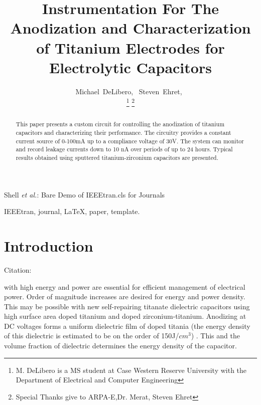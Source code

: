 \documentclass[journal]{IEEEtran}
\begin{document}
\title{Instrumentation For The Anodization and Characterization of Titanium Electrodes for Electrolytic Capacitors}

\author{Michael~DeLibero,~
       {Steven~Ehret,~
    }%

\thanks{M. DeLibero is a MS student at Case Western Reserve University with the Department
of Electrical and Computer Engineering}%
\thanks{Special Thanks give to ARPA-E,Dr. Merat, Steven Ehret}}

%
{Shell \MakeLowercase{\textit{et al.}}: Bare Demo of IEEEtran.cls for Journals}

\maketitle

\begin{abstract}
This paper presents a custom circuit for controlling the anodization of titanium capacitors and characterizing their performance. The circuitry provides a constant current source of 0-100mA up to a compliance voltage of 30V. The system can monitor and record leakage currents down to 10 nA over periods of up to 24 hours. Typical results obtained using sputtered titanium-zirconium capacitors are presented.
\end{abstract}

\begin{IEEEkeywords}
IEEEtran, journal, \LaTeX, paper, template.
\end{IEEEkeywords}

\IEEEpeerreviewmaketitle

\section{Introduction}

Citation:
\cite{knuth84}
\cite{tiCharHag}

 with high energy and power are essential for efficient management of electrical power.  Order of magnitude increases are desired for energy and power density. This may be possible with new self-repairing titanate dielectric capacitors using high surface area doped titanium and doped zirconium-titanium.  Anodizing at DC voltages forms a uniform dielectric film of doped titania (the energy density of this dielectric is estimated to be on the order of 150J/$cm^3$) \cite{tiSponge}. This and the volume fraction of dielectric determines the energy density of the capacitor.
\end{document}
